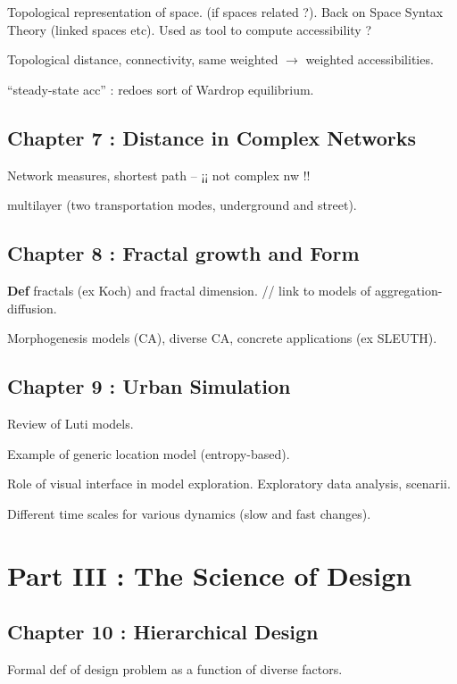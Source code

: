 Topological representation of space. (if spaces related ?). Back on Space Syntax Theory (linked spaces etc). Used as tool to compute accessibility ?

Topological distance, connectivity, same weighted $\rightarrow$ weighted accessibilities.

``steady-state acc'' : redoes sort of Wardrop equilibrium.

\subsection{Chapter 7 : Distance in Complex Networks}

Network measures, shortest path -- ¡¡ not complex nw !!

multilayer (two transportation modes, underground and street).

\subsection{Chapter 8 : Fractal growth and Form}

\textbf{Def} fractals (ex Koch) and fractal dimension. // link to models of aggregation-diffusion.

Morphogenesis models (CA), diverse CA, concrete applications (ex SLEUTH).


\subsection{Chapter 9 : Urban Simulation}

Review of Luti models.

Example of generic location model (entropy-based).

Role of visual interface in model exploration. Exploratory data analysis, scenarii.

Different time scales for various dynamics (slow and fast changes).


\section*{Part III : The Science of Design}


\subsection{Chapter 10 : Hierarchical Design}

Formal def of design problem as a function of diverse factors.

